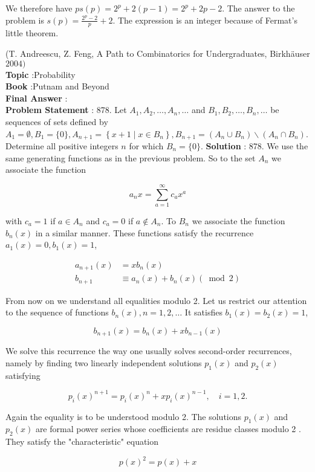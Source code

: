 \documentclass[10pt]{article}
\begin{document}
We therefore have $p s(p)=2^{p}+2(p-1)=2^{p}+2 p-2$. The answer to the problem is $s(p)=\frac{2^{p}-2}{p}+2$. The expression is an integer because of Fermat's little theorem.

(T. Andreescu, Z. Feng, A Path to Combinatorics for Undergraduates, Birkhäuser $2004)$
\\
\textbf{Topic} :Probability\\
\textbf{Book} :Putnam and Beyond\\
\textbf{Final Answer} :\\


\textbf{Problem Statement} :
878. Let $A_{1}, A_{2}, \ldots, A_{n}, \ldots$ and $B_{1}, B_{2}, \ldots, B_{n}, \ldots$ be sequences of sets defined by $A_{1}=\emptyset, B_{1}=\{0\}, A_{n+1}=\left\{x+1 \mid x \in B_{n}\right\}, B_{n+1}=\left(A_{n} \cup B_{n}\right) \backslash\left(A_{n} \cap B_{n}\right)$. Determine all positive integers $n$ for which $B_{n}=\{0\}$.
\textbf{Solution} :
878. We use the same generating functions as in the previous problem. So to the set $A_{n}$ we associate the function 

$$
a_{n} x=\sum_{a=1}^{\infty} c_{a} x^{a}
$$

with $c_{a}=1$ if $a \in A_{n}$ and $c_{a}=0$ if $a \notin A_{n}$. To $B_{n}$ we associate the function $b_{n}(x)$ in a similar manner. These functions satisfy the recurrence $a_{1}(x)=0, b_{1}(x)=1$,

$$
\begin{aligned}
a_{n+1}(x) &=x b_{n}(x) \\
b_{n+1} & \equiv a_{n}(x)+b_{n}(x)(\bmod 2)
\end{aligned}
$$

From now on we understand all equalities modulo 2. Let us restrict our attention to the sequence of functions $b_{n}(x), n=1,2, \ldots$ It satisfies $b_{1}(x)=b_{2}(x)=1$,

$$
b_{n+1}(x)=b_{n}(x)+x b_{n-1}(x)
$$

We solve this recurrence the way one usually solves second-order recurrences, namely by finding two linearly independent solutions $p_{1}(x)$ and $p_{2}(x)$ satisfying

$$
p_{i}(x)^{n+1}=p_{i}(x)^{n}+x p_{i}(x)^{n-1}, \quad i=1,2 .
$$

Again the equality is to be understood modulo 2. The solutions $p_{1}(x)$ and $p_{2}(x)$ are formal power series whose coefficients are residue classes modulo 2 . They satisfy the "characteristic" equation

$$
p(x)^{2}=p(x)+x
$$
\end{document}
